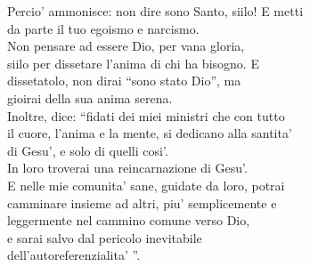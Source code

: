 \begin{haiku}
    Percio' ammonisce: non dire sono Santo, siilo! E metti\\
    da parte il tuo egoismo e narcismo.\\
    Non pensare ad essere Dio, per vana gloria, \\
    siilo per dissetare l'anima di chi ha bisogno. E\\
    dissetatolo, non dirai ``sono stato Dio'', ma \\
    gioirai della sua anima serena.\\
    Inoltre, dice: ``fidati dei miei ministri che con tutto\\
    il cuore, l'anima e la mente, si dedicano alla santita'\\
    di Gesu', e solo di quelli cosi'.\\
    In loro troverai una reincarnazione di Gesu'.\\
    E nelle mie comunita' sane, guidate da loro, potrai \\
    camminare insieme ad altri, piu' semplicemente e\\
    leggermente nel cammino comune verso Dio, \\
    e sarai salvo dal pericolo inevitabile\\
    dell'autoreferenzialita' ''.\\
\end{haiku}
